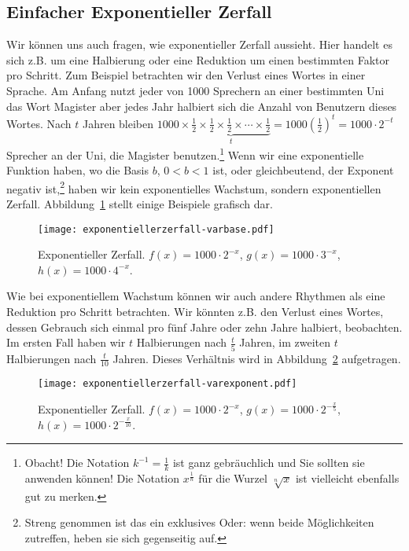 \documentclass[a4paper,12pt,oneside,leqno]{scrartcl}%
\newcommand{\enquote}[1]{\frqq{}#1\flqq{}}
\begin{document}
\subsection{Einfacher Exponentieller Zerfall}\label{sec:expzerfall}
Wir können uns auch fragen, wie exponentieller Zerfall aussieht.  Hier handelt es sich z.B. um eine Halbierung oder eine Reduktion um einen bestimmten Faktor pro Schritt. Zum Beispiel betrachten wir den Verlust eines Wortes in einer Sprache.  Am Anfang nutzt jeder von 1000 Sprechern an einer bestimmten Uni das Wort \enquote{Magister} aber jedes Jahr halbiert sich die Anzahl von Benutzern dieses Wortes.  Nach $t$ Jahren bleiben  
$\displaystyle 1000\times\underbrace{\frac{1}{2}\times{}\frac{1}{2}\times{}\frac{1}{2}\times{}\cdots{}\times{}\frac{1}{2}}_{t} =  1000\left(\frac{1}{2}\right)^{t} = 1000\cdot{}2^{-t}$ Sprecher an der Uni, die \enquote{Magister} benutzen.\footnote{Obacht! Die Notation $k^{-1}=\frac{1}{k}$ ist ganz gebräuchlich und Sie sollten sie anwenden können! Die Notation $x^{\frac{1}{n}}$ für die Wurzel $\sqrt[n]{x}$ ist vielleicht ebenfalls gut zu merken.} Wenn wir eine exponentielle Funktion haben, wo die Basis $b$, $0< b < 1$ ist, oder gleichbeutend, der Exponent negativ ist,\footnote{Streng genommen ist das ein exklusives Oder: wenn beide Möglichkeiten zutreffen, heben sie sich gegenseitig auf.} haben wir kein exponentielles Wachstum, sondern exponentiellen Zerfall. Abbildung~\ref{fig:expzerfall-varbase} stellt einige Beispiele grafisch dar.
\begin{figure}[htb]
\begin{center}
\texttt{[image: exponentiellerzerfall-varbase.pdf]}
\end{center}
\caption{Exponentieller Zerfall. $f(x)=1000\cdot{}2^{-x}$, $g(x)=1000\cdot{}3^{-x}$, $h(x)=1000\cdot{}4^{-x}$.}\label{fig:expzerfall-varbase}
\end{figure}

Wie bei exponentiellem Wachstum können wir auch andere \enquote{Rhythmen} als eine Reduktion pro Schritt betrachten.  Wir könnten z.B. den Verlust eines Wortes, dessen Gebrauch sich einmal pro fünf Jahre oder zehn Jahre halbiert, beobachten.  Im ersten Fall haben wir $t$ Halbierungen nach $\frac{t}{5}$ Jahren, im zweiten $t$ Halbierungen nach $\frac{t}{10}$ Jahren.  Dieses Verhältnis wird in Abbildung~\ref{fig:expzerfall-varexp} aufgetragen. 
\begin{figure}[htb]
\begin{center}
\texttt{[image: exponentiellerzerfall-varexponent.pdf]}
\end{center}
\caption{Exponentieller Zerfall. $f(x)=1000\cdot{}2^{-x}$, $g(x)=1000\cdot{}2^{-\frac{x}{5}}$, $h(x)=1000\cdot{}2^{-\frac{x}{10}}$.}\label{fig:expzerfall-varexp}
\end{figure}
\end{document}

